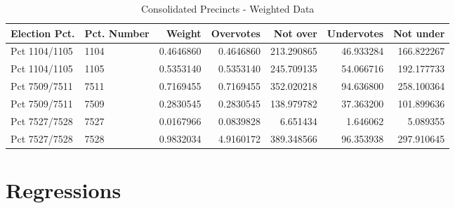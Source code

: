 \documentclass[12pt,twoside]{reedthesis}
\newenvironment{Shaded}{\begin{snugshade}}{\end{snugshade}}
\newcommand{\ControlFlowTok}[1]{\textcolor[rgb]{0.13,0.29,0.53}{\textbf{#1}}}
\newcommand{\DataTypeTok}[1]{\textcolor[rgb]{0.13,0.29,0.53}{#1}}
\newcommand{\DecValTok}[1]{\textcolor[rgb]{0.00,0.00,0.81}{#1}}
\newcommand{\KeywordTok}[1]{\textcolor[rgb]{0.13,0.29,0.53}{\textbf{#1}}}
\newcommand{\NormalTok}[1]{#1}
\newcommand{\OperatorTok}[1]{\textcolor[rgb]{0.81,0.36,0.00}{\textbf{#1}}}
\newcommand{\OtherTok}[1]{\textcolor[rgb]{0.56,0.35,0.01}{#1}}
\newcommand{\StringTok}[1]{\textcolor[rgb]{0.31,0.60,0.02}{#1}}
\theoremstyle{definition}
\theoremstyle{definition}
\theoremstyle{definition}
\theoremstyle{remark}
\begin{document}
\begin{Shaded}
\end{Shaded}
\begin{longtable}[t]{llrrrrr}
\caption[Combined Precincts - Weighted]{\label{tab:unnamed-chunk-8}Consolidated Precincts - Weighted Data}\\
\toprule
Election Pct. & Pct. Number & Weight & Overvotes & Not over & Undervotes & Not under\\
\midrule
Pct 1104/1105 & 1104 & 0.4646860 & 0.4646860 & 213.290865 & 46.933284 & 166.822267\\
Pct 1104/1105 & 1105 & 0.5353140 & 0.5353140 & 245.709135 & 54.066716 & 192.177733\\
Pct 7509/7511 & 7511 & 0.7169455 & 0.7169455 & 352.020218 & 94.636800 & 258.100364\\
Pct 7509/7511 & 7509 & 0.2830545 & 0.2830545 & 138.979782 & 37.363200 & 101.899636\\
Pct 7527/7528 & 7527 & 0.0167966 & 0.0839828 & 6.651434 & 1.646062 & 5.089355\\
Pct 7527/7528 & 7528 & 0.9832034 & 4.9160172 & 389.348566 & 96.353938 & 297.910645\\
\bottomrule
\end{longtable}
\hypertarget{regressions}{%
\section{Regressions}\label{regressions}}
\end{document}
